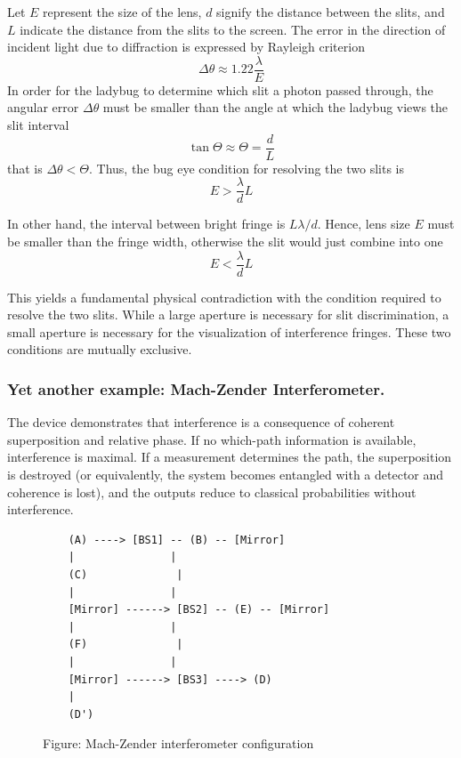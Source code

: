 \documentclass[../../../main.tex]{subfiles}
\begin{document}
Let $E$ represent the size of the lens, $d$ signify the distance between the slits, and $L$ indicate the distance from the slits to the screen.
The error in the direction of incident light due to diffraction is expressed by Rayleigh criterion
\begin{equation*}
  \Delta \theta \approx 1.22 \frac{\lambda }{E}
\end{equation*}
In order for the ladybug to determine which slit a photon passed through, the angular error $\Delta \theta$ must be smaller than the angle at which the ladybug views the slit interval
\begin{equation*}
  \tan \Theta \approx \Theta =\frac{d }{L}
\end{equation*}
that is $\Delta \theta <\Theta$.
Thus, the bug eye condition for resolving the two slits is
\begin{equation*}
  E> \frac{\lambda }{d}L
\end{equation*}

In other hand, the interval between bright fringe is $L \lambda/d$.
Hence, lens size $E$ must be smaller than the fringe width, otherwise the slit would just combine into one
\begin{equation*}
  E< \frac{\lambda }{d}L
\end{equation*}

This yields a fundamental physical contradiction with the condition required to resolve the two slits.
While a large aperture is necessary for slit discrimination, a small aperture is necessary for the visualization of interference fringes.
These two conditions are mutually exclusive.

\subsubsection{Yet another example: Mach-Zender Interferometer.}
The device demonstrates that interference is a consequence of coherent superposition and relative phase.
If no which-path information is available, interference is maximal.
If a measurement determines the path, the superposition is destroyed (or equivalently, the system becomes entangled with a detector and coherence is lost), and the outputs reduce to classical probabilities without interference.

\begin{figure}
  \centering
  \begin{BVerbatim}
    (A) ----> [BS1] -- (B) -- [Mirror]
    |               |
    (C)              |
    |               |
    [Mirror] ------> [BS2] -- (E) -- [Mirror]
    |               |
    (F)              |
    |               |
    [Mirror] ------> [BS3] ----> (D)
    |
    (D')
  \end{BVerbatim}
  \caption*{Figure: Mach-Zender interferometer configuration}
\end{figure}
\end{document}
